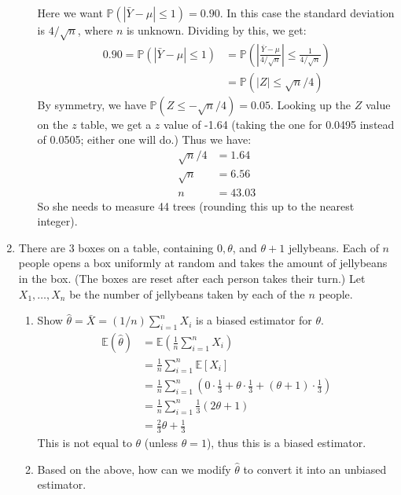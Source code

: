 \documentclass[12pt]{article}
\def\P{{\mathbb P}}
\begin{document}
\begin{enumerate}
\begin{enumerate}
Here we want $\P(|\bar{Y} - \mu| \leq 1) = 0.90$. In this case the standard deviation is $4 / \sqrt{n}$, where $n$ is unknown. Dividing by this, we get:
\begin{align*}
0.90 = \P(|\bar{Y} - \mu| \leq 1) &= \P \left( \left| \frac{ \bar{Y} - \mu }{ 4 / \sqrt{n} } \right| \leq \frac{1}{4 / \sqrt{n}} \right) \\
&= \P(|Z| \leq \sqrt{n}/4)
\end{align*}
By symmetry, we have $\P(Z \leq -\sqrt{n}/4) = 0.05$. Looking up the $Z$ value on the $z$ table, we get a $z$ value of -1.64 (taking the one for 0.0495 instead of 0.0505; either one will do.) Thus we have:
\begin{align*}
\sqrt{n}/4 &= 1.64 \\
\sqrt{n} &= 6.56\\
n &= 43.03
\end{align*}
So she needs to measure 44 trees (rounding this up to the nearest integer).
\end{enumerate}

\item There are 3 boxes on a table, containing $0, \theta$, and $\theta+1$ jellybeans.  Each of $n$ people opens a box uniformly at random and takes the amount of jellybeans in the box. (The boxes are reset after each person takes their turn.) Let $X_1, \dots, X_n$ be the number of jellybeans taken by each of the $n$ people.\\
\begin{enumerate}
\item Show $\hat{\theta} = \bar{X} = (1/n) \sum_{i=1}^n X_i$ is a biased estimator for $\theta$. \\

\begin{align*}
\mathbb{E}(\hat{\theta}) &= \mathbb{E}\left( \frac{1}{n} \sum_{i=1}^n X_i \right) \\
&= \frac{1}{n} \sum_{i=1}^n \mathbb{E}[X_i] \\
&=  \frac{1}{n} \sum_{i=1}^n \left( 0 \cdot \frac{1}{3} + \theta \cdot \frac{1}{3} + (\theta+1) \cdot \frac{1}{3} \right) \\
&=  \frac{1}{n} \sum_{i=1}^n \frac{1}{3}(2 \theta + 1) \\
&= \frac{2}{3} \theta + \frac{1}{3} 
\end{align*}
This is not equal to $\theta$ (unless $\theta = 1$), thus this is a biased estimator.
\item Based on the above, how can we modify $\hat{\theta}$ to convert it into an unbiased estimator.\\


\end{enumerate}
\end{enumerate}
\end{document}
